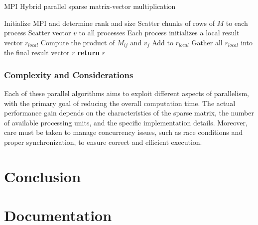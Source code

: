 \documentclass[12pt,oneside]{book} %
\begin{document}
\begin{algorithm}[H]
    \caption{MPI Hybrid parallel sparse matrix-vector multiplication}
    \begin{algorithmic}[1]
        \State Initialize MPI and determine rank and size
        \State Scatter chunks of rows of $M$ to each process
        \State Scatter vector $v$ to all processes
        \State Each process initializes a local result vector $r_{local}$
                \State Compute the product of $M_{ij}$ and $v_j$
                \State Add to $r_{local}$
            \EndFor
        \EndFor
        \State Gather all $r_{local}$ into the final result vector $r$
        \State \textbf{return} $r$
        \EndProcedure
    \end{algorithmic}
\end{algorithm}

\subsection*{Complexity and Considerations}

Each of these parallel algorithms aims to exploit different aspects of
parallelism, with the primary goal of reducing the overall computation time.
The actual performance gain depends on the characteristics of the sparse
matrix, the number of available processing units, and the specific
implementation details. Moreover, care must be taken to manage concurrency
issues, such as race conditions and proper synchronization, to ensure correct
and efficient execution.

\newpage
\chapter{Conclusion}




\appendix
\chapter{Documentation}
\end{document}
